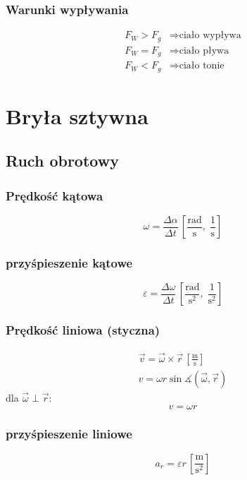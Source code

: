 \documentclass{article}
\numberwithin{equation}{section}
\newcommand{\unit}[1]{\, \left[\mathrm{#1}\right]}
\begin{document}
      \subsubsection{Warunki wypływania}
        \begin{align*}
          F_W > F_g &\Rightarrow \text{ciało wypływa}\\
          F_W = F_g &\Rightarrow \text{ciało pływa}\\
          F_W < F_g &\Rightarrow \text{ciało tonie}
        \end{align*}

  \newpage
  \section{Bryła sztywna}
    \subsection{Ruch obrotowy}
      \subsubsection{Prędkość kątowa}
        \begin{equation}
          \omega = \frac{\Delta\alpha}{\Delta t} \unit{\frac{rad}{s},\;\frac{1}{s}}
        \end{equation}
      \subsubsection{przyśpieszenie kątowe}
        \begin{equation}
          \varepsilon = \frac{\Delta\omega}{\Delta t} \unit{\frac{rad}{s^2},\;\frac{1}{s^2}}
        \end{equation}
      \subsubsection{Prędkość liniowa (styczna)}
        \begin{gather}
          \vec v = \vec\omega \times \vec r\unit{\frac{m}{s}}\\
          v = \omega r\sin\measuredangle (\vec\omega, \vec r)
        \end{gather}
        dla $\vec\omega \perp \vec r$:
        \begin{equation}
          v =\omega r
        \end{equation}
      \subsubsection{przyśpieszenie liniowe}
        \begin{equation}
          a_r = \varepsilon r \unit{\frac{m}{s^2}}
        \end{equation}
\end{document}
